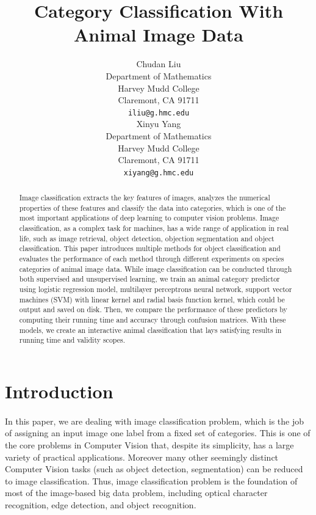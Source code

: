 \documentclass{article}
\title{Category Classification With Animal Image Data}
\author{
 Chudan Liu\\
 Department of Mathematics\\
 Harvey Mudd College\\
 Claremont, CA 91711 \\
 \texttt{iliu@g.hmc.edu} \\
  \And
  Xinyu Yang \\
  Department of Mathematics\\
  Harvey Mudd College \\
  Claremont, CA 91711 \\
  \texttt{xiyang@g.hmc.edu} \\
}
\begin{document}

\maketitle

\begin{abstract}
 
Image classification extracts the key features of images, analyzes the numerical properties of these features and classify the data into categories, which is one of the most important applications of deep learning to computer vision problems. Image classification, as a complex task for machines, has a wide range of application in real life, such as image retrieval, object detection, objection segmentation and object classification. This paper introduces multiple methods for object classification and evaluates the performance of each method through different experiments on species categories of animal image data. While image classification can be conducted through both supervised and unsupervised learning, we train an animal category predictor using logistic regression model, multilayer perceptrons neural network, support vector machines (SVM) with linear kernel and radial basis function kernel, which could be output and saved on disk. Then, we compare the performance of these predictors by computing their running time and accuracy through confusion matrices. With these models, we create an interactive animal classification that lays satisfying results in running time and validity scopes. 
\end{abstract}

\section{Introduction}
\paragraph{}
In this paper, we are dealing with image classification problem, which is the job of assigning an input image one label from a fixed set of categories. This is one of the core problems in Computer Vision that, despite its simplicity, has a large variety of practical applications. Moreover many other seemingly distinct Computer Vision tasks (such as object detection, segmentation) can be reduced to image classification. Thus, image classification problem is the foundation of most of the image-based big data problem, including optical character recognition, edge detection, and object recognition.
\end{document}
